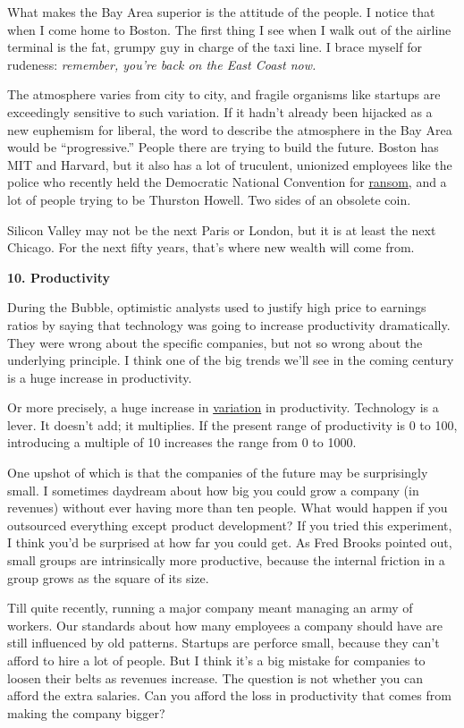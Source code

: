 What makes the Bay Area superior is the attitude of the people. I notice
that when I come home to Boston. The first thing I see when I walk out
of the airline terminal is the fat, grumpy guy in charge of the taxi
line. I brace myself for rudeness: \emph{remember, you're back on the
East Coast now.}

The atmosphere varies from city to city, and fragile organisms like
startups are exceedingly sensitive to such variation. If it hadn't
already been hijacked as a new euphemism for liberal, the word to
describe the atmosphere in the Bay Area would be ``progressive.'' People
there are trying to build the future. Boston has MIT and Harvard, but it
also has a lot of truculent, unionized employees like the police who
recently held the Democratic National Convention for
\href{http://www.usatoday.com/news/politicselections/nation/president/2004-04-30-boston-police-convention_x.htm}{ransom},
and a lot of people trying to be Thurston Howell. Two sides of an
obsolete coin.

Silicon Valley may not be the next Paris or London, but it is at least
the next Chicago. For the next fifty years, that's where new wealth will
come from.

\textbf{10. Productivity}

During the Bubble, optimistic analysts used to justify high price to
earnings ratios by saying that technology was going to increase
productivity dramatically. They were wrong about the specific companies,
but not so wrong about the underlying principle. I think one of the big
trends we'll see in the coming century is a huge increase in
productivity.

Or more precisely, a huge increase in \href{gh.html}{variation} in
productivity. Technology is a lever. It doesn't add; it multiplies. If
the present range of productivity is 0 to 100, introducing a multiple of
10 increases the range from 0 to 1000.

One upshot of which is that the companies of the future may be
surprisingly small. I sometimes daydream about how big you could grow a
company (in revenues) without ever having more than ten people. What
would happen if you outsourced everything except product development? If
you tried this experiment, I think you'd be surprised at how far you
could get. As Fred Brooks pointed out, small groups are intrinsically
more productive, because the internal friction in a group grows as the
square of its size.

Till quite recently, running a major company meant managing an army of
workers. Our standards about how many employees a company should have
are still influenced by old patterns. Startups are perforce small,
because they can't afford to hire a lot of people. But I think it's a
big mistake for companies to loosen their belts as revenues increase.
The question is not whether you can afford the extra salaries. Can you
afford the loss in productivity that comes from making the company
bigger?

